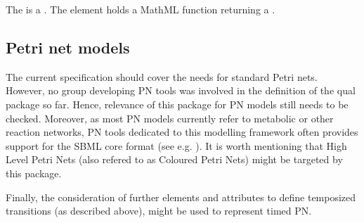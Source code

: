 The  is a . The element  holds a MathML function returning a . 

\subsection{Petri net models}

The current specification should cover the needs for standard Petri
nets. However,  no group developing PN tools was
involved in the definition of the qual package so far. Hence, relevance of this package for PN models still needs to be checked. Moreover, as most PN models currently refer to metabolic or other reaction networks, PN tools dedicated to this modelling framework often provides support for the SBML core format (see e.g. \cite{snoopy10}).
It is worth mentioning that High Level Petri Nets (also refered
to as Coloured Petri Nets) might be targeted by this package.

Finally, the consideration of further elements and attributes to define temposized transitions (as described above), might be used to represent timed PN.
